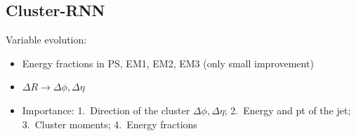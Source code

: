 \subsection{Cluster-RNN}
\label{sec:rnn_clusters}



Variable evolution:
\begin{itemize}
\item Energy fractions in PS, EM1, EM2, EM3 (only small improvement)
\item $\Delta R \rightarrow \Delta \phi, \Delta \eta$
\item Importance: 1.\ Direction of the cluster $\Delta \phi, \Delta \eta$; 2.\
  Energy and pt of the jet; 3.\ Cluster moments; 4.\ Energy fractions
\end{itemize}

